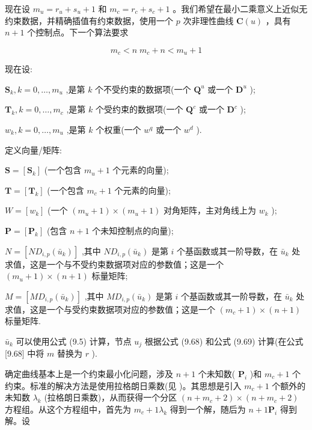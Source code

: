 \documentclass[../main.tex]{subfiles}
\begin{document}
现在设 \({m}_{u} = {r}_{u} + {s}_{u} + 1\) 和 \({m}_{c} = {r}_{c} + {s}_{c} + 1\) 。我们希望在最小二乘意义上近似无约束数据，并精确插值有约束数据，使用一个 \(p\) 次非理性曲线 \(\mathbf{C}\left( u\right)\) ，具有 \(n + 1\) 个控制点。下一个算法要求

\[
{m}_{c} < n\;{m}_{c} + n < {m}_{u} + 1 \tag{9.70}
\]



现在设:

\({\mathbf{S}}_{k},k = 0,\ldots ,{m}_{u}\) ,是第 \(k\) 个不受约束的数据项(一个 \({\mathbf{Q}}^{u}\) 或一个 \({\mathbf{D}}^{u}\) );

\({\mathbf{T}}_{k},k = 0,\ldots ,{m}_{c}\) ,是第 \(k\) 个受约束的数据项(一个 \({\mathbf{Q}}^{c}\) 或一个 \({\mathbf{D}}^{c}\) );

\({w}_{k},k = 0,\ldots ,{m}_{u}\) ,是第 \(k\) 个权重(一个 \({w}^{q}\) 或一个 \({w}^{d}\) ).

定义向量/矩阵:

\(\mathbf{S} = \left\lbrack  {\mathbf{S}}_{k}\right\rbrack\) (一个包含 \({m}_{u} + 1\) 个元素的向量);

\(\mathbf{T} = \left\lbrack  {\mathbf{T}}_{k}\right\rbrack\) (一个包含 \({m}_{c} + 1\) 个元素的向量);

\(W = \left\lbrack  {w}_{k}\right\rbrack\) (一个 \(\left( {{m}_{u} + 1}\right)  \times  \left( {{m}_{u} + 1}\right)\) 对角矩阵，主对角线上为 \({w}_{k}\) );

\(\mathbf{P} = \left\lbrack  {\mathbf{P}}_{k}\right\rbrack\) (包含 \(n + 1\) 个未知控制点的向量);

\(N = \left\lbrack  {N{D}_{i,p}\left( {\bar{u}}_{k}\right) }\right\rbrack\) ,其中 \(N{D}_{i,p}\left( {\bar{u}}_{k}\right)\) 是第 \(i\) 个基函数或其一阶导数，在 \({\bar{u}}_{k}\) 处求值，这是一个与不受约束数据项对应的参数值；这是一个 \(\left( {{m}_{u} + 1}\right)  \times  \left( {n + 1}\right)\) 标量矩阵;

\(M = \left\lbrack  {M{D}_{i,p}\left( {\bar{u}}_{k}\right) }\right\rbrack\) ,其中 \(M{D}_{i,p}\left( {\bar{u}}_{k}\right)\) 是第 \(i\) 个基函数或其一阶导数，在 \({\bar{u}}_{k}\) 处求值，这是一个与受约束数据项对应的参数值；这是一个 \(\left( {{m}_{c} + 1}\right)  \times  \left( {n + 1}\right)\) 标量矩阵.

\({\bar{u}}_{k}\) 可以使用公式 (9.5) 计算，节点 \({u}_{j}\) 根据公式 (9.68) 和公式 (9.69) 计算(在公式 [9.68] 中将 \(m\) 替换为 \(r\) ).

确定曲线基本上是一个约束最小化问题，涉及 \(n + 1\) 个未知数( \({\mathbf{P}}_{i}\) )和 \({m}_{c} + 1\) 个约束。标准的解决方法是使用拉格朗日乘数(见 \cite{Kapl52})。其思想是引入 \({m}_{c} + 1\) 个额外的未知数 \({\lambda }_{k}\) (拉格朗日乘数)，从而获得一个分区 \(\left( {n + {m}_{c} + 2}\right)  \times  \left( {n + {m}_{c} + 2}\right)\) 方程组。从这个方程组中，首先为 \({m}_{c} + 1{\lambda }_{k}\) 得到一个解，随后为 \(n + 1{\mathbf{P}}_{i}\) 得到解。设
\end{document}
